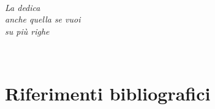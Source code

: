 \documentclass[12pt,a4paper,twoside]{book}
\begin{document}
\pagestyle{empty}



\newpage~\newpage
{}

\topmargin=-1cm

\newpage

\topmargin=6.5cm
\begin{flushright}
\emph{
\LARGE{La dedica}\\\vspace{2mm}
\LARGE{anche quella se vuoi}\\\vspace{3mm} 
\LARGE{su più righe} 
}
\end{flushright}

\tableofcontents
\thispagestyle{empty}
\listoftables
\thispagestyle{empty}
\listoffigures
\thispagestyle{empty}
\newpage~\newpage









\renewcommand{\bibsection}{}
\chapter*{Riferimenti bibliografici}

\newpage
\end{document}
